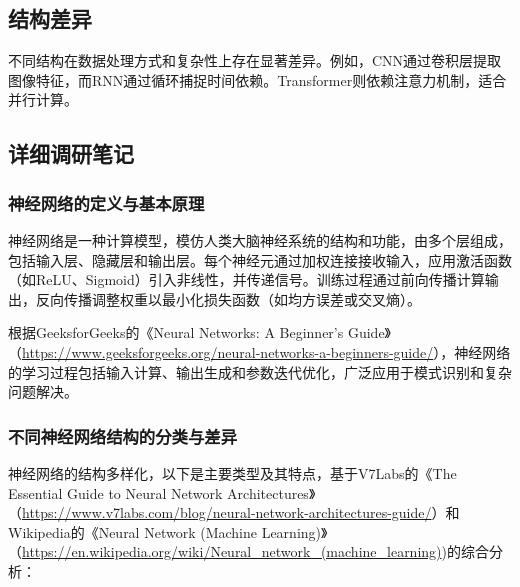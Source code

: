 \documentclass[UTF8]{report}
\theoremstyle{MyLineTheoremStyle} %
\theoremstyle{MyBlockTheoremStyle} %
\theoremstyle{MySubsubsectionStyle} %
\begin{document}
\subsection{结构差异}
不同结构在数据处理方式和复杂性上存在显著差异。例如，CNN通过卷积层提取图像特征，而RNN通过循环捕捉时间依赖。Transformer则依赖注意力机制，适合并行计算。

\subsection{详细调研笔记}

\subsubsection{神经网络的定义与基本原理}
神经网络是一种计算模型，模仿人类大脑神经系统的结构和功能，由多个层组成，包括输入层、隐藏层和输出层。每个神经元通过加权连接接收输入，应用激活函数（如ReLU、Sigmoid）引入非线性，并传递信号。训练过程通过前向传播计算输出，反向传播调整权重以最小化损失函数（如均方误差或交叉熵）。

根据GeeksforGeeks的《Neural Networks: A Beginner's Guide》（\url{https://www.geeksforgeeks.org/neural-networks-a-beginners-guide/}），神经网络的学习过程包括输入计算、输出生成和参数迭代优化，广泛应用于模式识别和复杂问题解决。

\subsubsection{不同神经网络结构的分类与差异}
神经网络的结构多样化，以下是主要类型及其特点，基于V7Labs的《The Essential Guide to Neural Network Architectures》（\url{https://www.v7labs.com/blog/neural-network-architectures-guide/}）和Wikipedia的《Neural Network (Machine Learning)》（\url{https://en.wikipedia.org/wiki/Neural_network_(machine_learning)})的综合分析：
\end{document}
